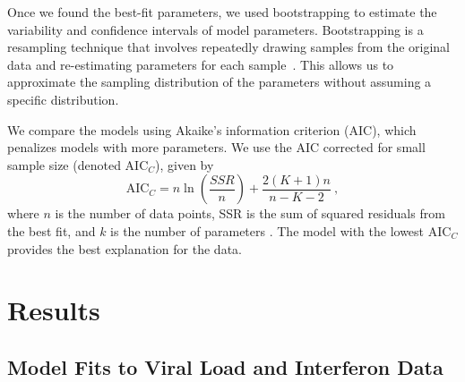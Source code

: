 \documentclass[12pt]{article}
\newcommand{\aicc}{\ensuremath{\mathrm{AIC}_C}\xspace}
\begin{document}
Once we found the best-fit parameters, we used bootstrapping to estimate the variability and confidence intervals of model parameters. Bootstrapping is a resampling technique that involves repeatedly drawing samples from the original data and re-estimating parameters for each sample~\cite{stoffer91}. This allows us to approximate the sampling distribution of the parameters without assuming a specific distribution.

We compare the models using Akaike's information criterion (AIC), which penalizes models with more parameters. We use the AIC corrected for small sample size (denoted \aicc), given by 
\begin{equation*}
\aicc = n\ln\left(\frac{SSR}{n}\right)+\frac{2(K+1)n}{n-K-2} \ ,
\end{equation*}
where $n$ is the number of data points, SSR is the sum of squared residuals from the best fit, and $k$ is the number of parameters \cite{akaike74}. The model with the lowest \aicc provides the best explanation for the data.

\section{Results}

\subsection{Model Fits to Viral Load and Interferon Data}
\end{document}
